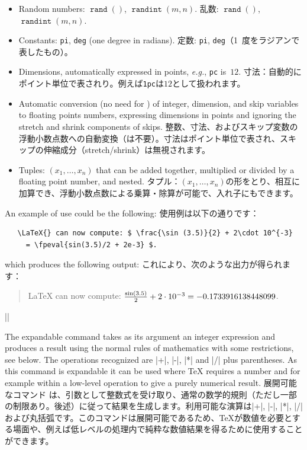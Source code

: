 \documentclass{ltxguide}
\newcommand\jpnewline{\vspace{3pt}\newline}
\providecommand\fpop[1]{\mathop{\texttt{#1}}}
\begin{document}
\begin{itemize}
  \item Random numbers: $\fpop{rand}()$, $\fpop{randint}(m,n)$.
  \jpnewline
    乱数: $\fpop{rand}()$, $\fpop{randint}(m,n)$.
  \item Constants: \texttt{pi}, \texttt{deg} (one degree in radians).
  \jpnewline
  定数: \texttt{pi}, \texttt{deg}（1~度をラジアンで表したもの）。
  \item Dimensions, automatically expressed in points, \emph{e.g.},
    \texttt{pc} is~$12$.
    \jpnewline
    寸法：自動的にポイント単位で表されり。例えば\texttt{1pc}は$12$として扱われます。
  \item Automatic conversion (no need for ) of
    integer, dimension, and skip variables to floating points numbers,
    expressing dimensions in points and ignoring the stretch and
    shrink components of skips.
    \jpnewline
    整数、寸法、およびスキップ変数の浮動小数点数への自動変換（は不要）。寸法はポイント単位で表され、スキップの伸縮成分（stretch/shrink）は無視されます。
  \item Tuples: $(x_1,\ldots{},x_n)$ that can be added together,
    multiplied or divided by a floating point number, and nested.
    \jpnewline
    タプル：$(x_1,\ldots{},x_n)$の形をとり、相互に加算でき、浮動小数点数による乗算・除算が可能で、入れ子にもできます。
\end{itemize}

An example of use could be the following:
\jpnewline
使用例は以下の通りです：
\begin{verbatim}
   \LaTeX{} can now compute: $ \frac{\sin (3.5)}{2} + 2\cdot 10^{-3}
     = \fpeval{sin(3.5)/2 + 2e-3} $.
\end{verbatim}
which produces the following output:
\jpnewline
これにより、次のような出力が得られます：
\begin{quote}
  \LaTeX{} can now compute: $ \frac{\sin (3.5)}{2} + 2\cdot 10^{-3}
  = \fpeval{sin(3.5)/2 + 2e-3} $.
\end{quote}

\begin{decl}
  |\inteval| 
\end{decl}

  The expandable command  takes as its argument an integer
  expression and produces a result using the normal rules of
  mathematics with some restrictions, see below. The operations
  recognized are |+|, |-|, |*| and |/| plus parentheses.  As this
  command is expandable it can be used where \TeX{} requires a number
  and for example within a low-level  operation to give a
  purely numerical result.
\jpnewline
展開可能なコマンド は、引数として整数式を受け取り、通常の数学的規則（ただし一部の制限あり。後述）に従って結果を生成します。利用可能な演算は|+|, |-|, |*|, |/| および丸括弧です。このコマンドは展開可能であるため、\TeX{}が数値を必要とする場面や、例えば低レベルの処理内で純粋な数値結果を得るために使用することができます。
\end{document}
